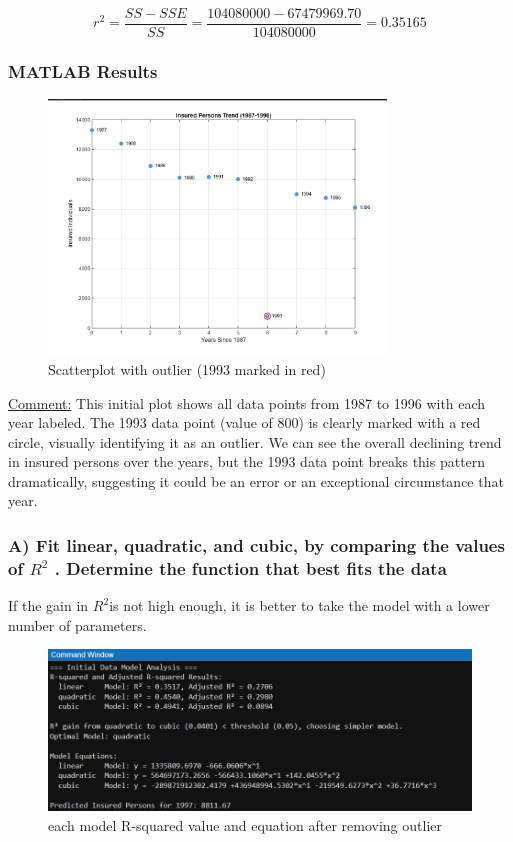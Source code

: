 \documentclass[12pt]{article}
\begin{document}
\[
r^2 = \frac{SS - SSE}{SS} =\frac{104080000 - 67479969.70}{104080000} = 0.35165
\]

\subsubsection*{MATLAB Results}
\begin{figure}[H]
    \centering
    \includegraphics[width=0.8\textwidth]{1.png}
    \caption{Scatterplot with outlier (1993 marked in red)}
\end{figure}
\newpage
\begin{adjustwidth}{0cm}{0cm} %
\uline{Comment:} This initial plot shows all data points from 1987 to 1996 with each year labeled. The 1993 data point (value of 800) is clearly marked with a red circle, visually identifying it as an outlier. We can see the overall declining trend in insured persons over the years, but the 1993 data point breaks this pattern dramatically, suggesting it could be an error or an exceptional circumstance that year.
\end{adjustwidth}


\subsubsection*{A) Fit linear, quadratic, and cubic, by comparing the values of $R^2$ . Determine the function that best fits the data}
If the gain in $R^2$is not high enough, it is better to take the model with a lower number of parameters.
    \begin{figure}[H]
    \centering
    \includegraphics[width=0.8\linewidth]{2.png}
    \caption{each model R-squared value and equation after removing outlier}
    \label{fig:enter-label}
    \end{figure}
    
\end{document}
